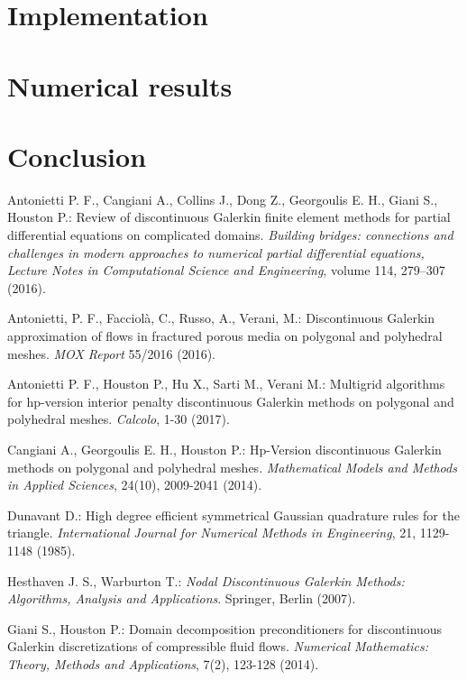 \documentclass[12pt, a4paper]{article}
\theoremstyle{definition}
\theoremstyle{plain}
\theoremstyle{plain}
\begin{document}
\section{Implementation}\label{sec:imp}
	
\section{Numerical results}\label{sec:res}

\section{Conclusion}\label{sec:conc}

\newpage
\begin{thebibliography}{99}
	Antonietti P. F., Cangiani  A., Collins J., Dong Z., Georgoulis E. H., Giani S., Houston P.: Review of discontinuous Galerkin finite element methods for partial differential equations on complicated domains. \emph{Building bridges: connections and challenges in modern approaches to numerical partial differential equations, Lecture Notes in Computational Science and Engineering}, volume 114, 279–307 (2016).
	
	Antonietti, P. F., Facciolà, C., Russo, A., Verani, M.: Discontinuous Galerkin approximation of flows in fractured porous media on polygonal and polyhedral meshes. \emph{MOX Report} 55/2016 (2016).
	
	Antonietti P. F., Houston  P., Hu  X., Sarti  M., Verani M.: Multigrid algorithms for hp-version interior penalty discontinuous Galerkin methods on polygonal and	polyhedral meshes. \emph{Calcolo}, 1-30 (2017).
	
	Cangiani A., Georgoulis E. H., Houston P.: Hp-Version discontinuous Galerkin methods on polygonal and polyhedral meshes. \emph{Mathematical Models and Methods in Applied Sciences}, 24(10), 2009-2041 (2014).
	
	Dunavant D.: High degree efficient symmetrical Gaussian quadrature rules for the triangle. \emph{International Journal for Numerical Methods in Engineering}, 21, 1129-1148 (1985).
	
	Hesthaven J. S., Warburton T.: \emph{Nodal Discontinuous Galerkin Methods: Algorithms, Analysis and Applications}. Springer, Berlin (2007).
	
	Giani S., Houston P.: Domain decomposition preconditioners for discontinuous Galerkin discretizations of compressible fluid flows. \emph{Numerical Mathematics: Theory, Methods and Applications}, 7(2), 123-128 (2014).
	

\end{thebibliography}
\end{document}
